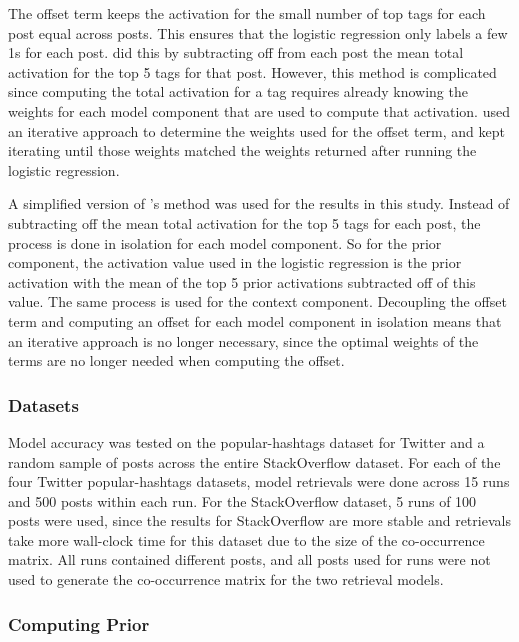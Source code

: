 \documentclass[man,floatsintext,donotrepeattitle]{apa6}
\begin{document}
The offset term keeps the activation for the small number of top tags for each post equal across posts.
This ensures that the logistic regression only labels a few 1s for each post.
\textcite{Stanley2013} did this by subtracting off from each post the mean total activation for the top 5 tags for that post.
However, this method is complicated since computing the total activation for a tag requires already knowing the weights for each model component that are used to compute that activation.
\citeauthor{Stanley2013} used an iterative approach to determine the weights used for the offset term, and kept iterating until those weights matched the weights returned after running the logistic regression.

A simplified version of \citeauthor{Stanley2013}'s method was used for the results in this study.
Instead of subtracting off the mean total activation for the top 5 tags for each post, the process is done in isolation for each model component.
So for the prior component, the activation value used in the logistic regression is the prior activation with the mean of the top 5 prior activations subtracted off of this value.
The same process is used for the context component.
Decoupling the offset term and computing an offset for each model component in isolation means that an iterative approach is no longer necessary,
since the optimal weights of the terms are no longer needed when computing the offset.

\subsubsection{Datasets}

Model accuracy was tested on the popular-hashtags dataset for Twitter and a random sample of posts across the entire StackOverflow dataset.
For each of the four Twitter popular-hashtags datasets, model retrievals were done across 15 runs and 500 posts within each run.
For the StackOverflow dataset, 5 runs of 100 posts were used, since the results for StackOverflow are more stable and retrievals take more wall-clock time for this dataset due to the size of the co-occurrence matrix.
All runs contained different posts, and all posts used for runs were not used to generate the co-occurrence matrix for the two retrieval models.

\subsubsection{Computing Prior}
\end{document}
